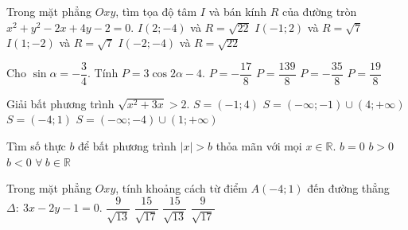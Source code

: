 \begin{ex}%
Trong mặt phẳng $O x y$, tìm tọa độ tâm $I$ và bán kính $R$ của đường tròn \\ $x^2 + y^2 - 2x + 4y - 2=0$. 
	\choice
	{$I(2; -4)$ và $R = \sqrt{22}$}
	{$I(-1; 2)$ và $R = \sqrt{7}$}
	{\True $I(1; -2)$ và $R = \sqrt{7}$}
	{$I(-2; -4)$ và $R = \sqrt{22}$}
\end{ex}
\begin{ex}%
Cho $\sin \alpha = - \dfrac{3}{4}$. Tính $P = 3 \cos 2 \alpha - 4$. 
	\choice
	{$P = - \dfrac{17}{8}$}
	{$P = \dfrac{139}{8}$}
	{\True $P = - \dfrac{35}{8}$}
	{$P = \dfrac{19}{8}$}
\end{ex}
\begin{ex}%
Giải bất phương trình $\sqrt{x^2 + 3x} > 2$. 
	\choice
	{$S = (-1; 4)$}
	{$S = (-\infty; -1) \cup (4; +\infty)$}
	{$S= (-4; 1)$}
	{\True $S = (-\infty; -4) \cup (1; +\infty)$}
\end{ex}
\begin{ex}%
Tìm số thực $b$ để bất phương trình $|x| >b$ thỏa mãn với mọi $x \in \mathbb{R}$. 
	\choice
	{$b=0$}
	{$b>0$}
	{\True $b<0$}
	{$\forall \ b \in \mathbb{R}$}
\end{ex}
\begin{ex}%
Trong mặt phẳng $O x y$, tính khoảng cách từ điểm $A (-4; 1)$ đến đường thẳng \\ $\Delta: \ 3x-2y-1 =0$. 
	\choice
	{$\dfrac{9}{\sqrt{13}}$}
	{$\dfrac{15}{\sqrt{17}}$}
	{\True $\dfrac{15}{\sqrt{13}}$}
	{$\dfrac{9}{\sqrt{17}}$}
\end{ex}


